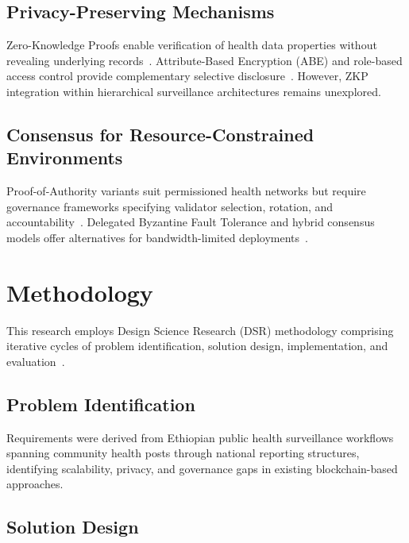\documentclass[AMA,LATO1COL]{WileyNJDv5}
\begin{document}
\subsection{Privacy-Preserving Mechanisms}

Zero-Knowledge Proofs enable verification of health data properties without revealing underlying records~\cite{Sun2021,Goel2025}. Attribute-Based Encryption (ABE) and role-based access control provide complementary selective disclosure~\cite{Pussewalage2017,Nandanwar2025}. However, ZKP integration within hierarchical surveillance architectures remains unexplored.

\subsection{Consensus for Resource-Constrained Environments}

Proof-of-Authority variants suit permissioned health networks but require governance frameworks specifying validator selection, rotation, and accountability~\cite{Toyoda2020,Khan2025}. Delegated Byzantine Fault Tolerance and hybrid consensus models offer alternatives for bandwidth-limited deployments~\cite{Quan2025}.

\section{Methodology}\label{sec:methodology}

This research employs Design Science Research (DSR) methodology comprising iterative cycles of problem identification, solution design, implementation, and evaluation~\cite{Hevner2004}.

\subsection{Problem Identification}

Requirements were derived from Ethiopian public health surveillance workflows spanning community health posts through national reporting structures, identifying scalability, privacy, and governance gaps in existing blockchain-based approaches.

\subsection{Solution Design}
\end{document}
